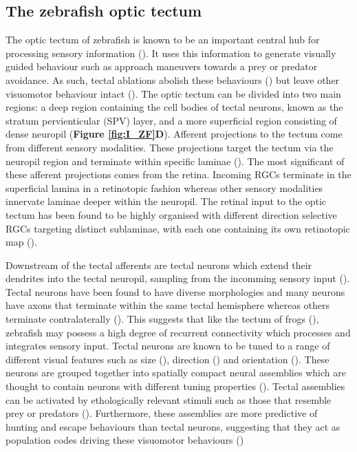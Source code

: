 \subsection{The zebrafish optic tectum}
The optic tectum of zebrafish is known to be an important central hub for processing sensory information (\cite{Nevin2010}). It uses this information to generate visually guided behaviour such as approach maneuvers towards a prey or predator avoidance. As such, tectal ablations abolish these behaviours (\cite{Gahtan2005}) but leave other visuomotor behaviour intact (\cite{Roeser2003}). The optic tectum can be divided into two main regions: a deep region containing the cell bodies of tectal neurons, known as the stratum pervienticular (SPV) layer, and a more superficial region consisting of dense neuropil (\textbf{Figure \ref{fig:I_ZF}D}). Afferent projections to the tectum come from different sensory modalities. These projections target the tectum via the neuropil region and terminate within specific laminae (\cite{Xiao2005AProjection, Xiao2007Lamina-specificDragnet}). The most significant of these afferent projections comes from the retina.  Incoming RGCs terminate in the superficial lamina in a retinotopic fashion whereas other sensory modalities innervate laminae deeper within the neuropil. The retinal input to the optic tectum has been found to be highly organised with different direction selective RGCs targeting distinct sublaminae, with each one containing its own retinotopic map (\cite{Nikolaou2012ParametricTectum, Xiao2007Lamina-specificDragnet}). 

Downstream of the tectal afferents are tectal neurons which extend their dendrites into the tectal neuropil, sampling from the incomming sensory input (\cite{Kinoshita2006RolesTectum}). Tectal neurons have been found to have diverse morphologies and many neurons have axons that terminate within the same tectal hemisphere whereas others terminate contralaterally (\cite{Scott2007TargetingTrapping, Scott2009TheLines, Gebhardt2019AnTectum}). This suggests that like the tectum of frogs (\cite{Pratt2008DevelopmentTectum}), zebrafish may possess a high degree of recurrent connectivity which processes and integrates sensory input. Tectal neurons are known to be tuned to a range of different visual features such as size (\cite{DelBene2010FilteringCircuit}), direction (\cite{Hunter2013, Grama2012DirectionInhibition}) and orientation (\cite{Hunter2013}).  These neurons are grouped together into spatially compact neural assemblies which are thought to contain neurons with different tuning properties (\cite{Romano2015, Bianco2015, Dunn2016}). Tectal assemblies can be activated by ethologically relevant stimuli such as those that resemble prey or predators  (\cite{Bianco2015, Romano2015, Dunn2016, Avitan2019}). Furthermore, these assemblies are more predictive of hunting and escape behaviours than tectal neurons, suggesting that they act as population codes driving these visuomotor behaviours (\cite{Avitan2016, Avitan2019, Dunn2016})

